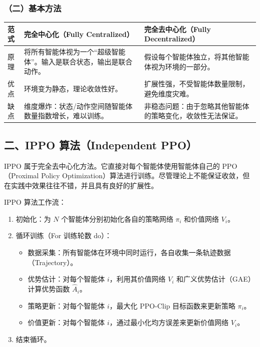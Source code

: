 \hypertarget{ux4e8cux57faux672cux65b9ux6cd5}{%
\subsubsection{（二）基本方法}\label{ux4e8cux57faux672cux65b9ux6cd5}}

\begin{longtable}[]{@{}
  >{\raggedright\arraybackslash}p{}
  >{\raggedright\arraybackslash}p{}
  >{\raggedright\arraybackslash}p{}@{}}
\toprule
范式 & 完全中心化（Fully Centralized） & 完全去中心化（Fully Decentralized） \\
\midrule
\endhead
原理 & 将所有智能体视为一个``超级智能体''。输入是联合状态，输出是联合动作。 & 假设每个智能体独立，将其他智能体视为环境的一部分。 \\
优点 & 环境变为静态，理论收敛性好。 & 扩展性强，不受智能体数量限制，避免维度灾难。 \\
缺点 & 维度爆炸：状态/动作空间随智能体数量指数增长，难以训练。 & 非稳态问题：由于忽略其他智能体的策略变化，收敛性无法保证。 \\
\bottomrule
\end{longtable}

\hypertarget{ux4e8cippo-ux7b97ux6cd5independent-ppo}{%
\subsection{二、IPPO 算法（Independent PPO）}\label{ux4e8cippo-ux7b97ux6cd5independent-ppo}}

IPPO 属于完全去中心化方法。它直接对每个智能体使用智能体自己的 PPO（Proximal Policy Optimization）算法进行训练。尽管理论上不能保证收敛，但在实践中效果往往不错，并且具有良好的扩展性。

IPPO 算法工作流：

\begin{enumerate}
\def\labelenumi{\arabic{enumi}.}
\tightlist
\item
  初始化：为 \(N\) 个智能体分别初始化各自的策略网络 \(\pi_i\) 和价值网络 \(V_i\)。
\item
  循环训练（For 训练轮数 do）：

  \begin{itemize}
  \tightlist
  \item
    数据采集：所有智能体在环境中同时运行，各自收集一条轨迹数据（Trajectory）。
  \item
    优势估计：对每个智能体 \(i\)，利用其价值网络 \(V_i\) 和广义优势估计（GAE）计算优势函数 \(\hat{A}_i\)。
  \item
    策略更新：对每个智能体 \(i\)，最大化 PPO-Clip 目标函数来更新策略 \(\pi_i\)。
  \item
    价值更新：对每个智能体 \(i\)，通过最小化均方误差来更新价值网络 \(V_i\)。
  \end{itemize}
\item
  结束循环。
\end{enumerate}


